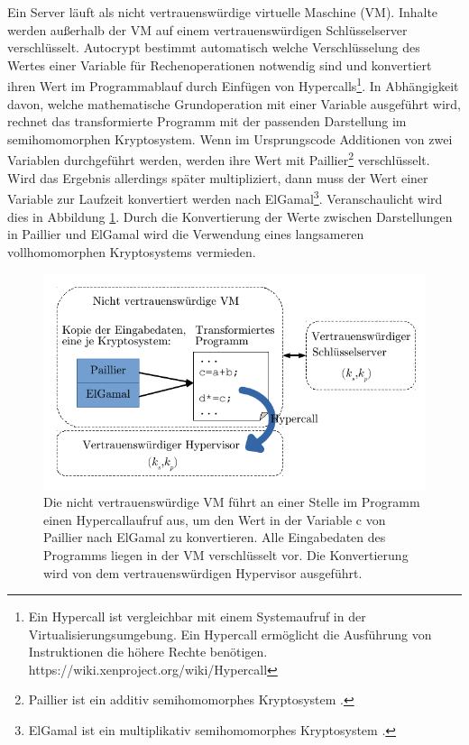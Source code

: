 Ein Server läuft als nicht vertrauenswürdige virtuelle Maschine (VM). Inhalte werden außerhalb der VM auf einem vertrauenswürdigen Schlüsselserver verschlüsselt. Autocrypt bestimmt automatisch welche Verschlüsselung des Wertes einer Variable für Rechenoperationen notwendig sind und konvertiert ihren Wert im Programmablauf durch Einfügen von Hypercalls\footnote{Ein Hypercall ist vergleichbar mit einem Systemaufruf in der Virtualisierungsumgebung. Ein Hypercall ermöglicht die Ausführung von Instruktionen die höhere Rechte benötigen. https://wiki.xenproject.org/wiki/Hypercall}. In Abhängigkeit davon, welche mathematische Grundoperation mit einer Variable ausgeführt wird, rechnet das transformierte Programm mit der passenden Darstellung im semihomomorphen Kryptosystem. Wenn im Ursprungscode Additionen von zwei Variablen durchgeführt werden, werden ihre Wert mit Paillier\footnote{Paillier ist ein additiv semihomomorphes Kryptosystem \cite{paillier1999public}.} verschlüsselt. Wird das Ergebnis allerdings später multipliziert, dann muss der Wert einer Variable zur Laufzeit konvertiert werden nach ElGamal\footnote{ElGamal ist ein multiplikativ semihomomorphes Kryptosystem \cite[p.32]{yi2014homomorphic}.}. Veranschaulicht wird dies in Abbildung \ref{fig:autocrypt}. Durch die Konvertierung der Werte zwischen Darstellungen in Paillier und ElGamal wird die Verwendung eines langsameren vollhomomorphen Kryptosystems vermieden.

\begin{figure}[h]
	\begin{center}
		\includegraphics{fig/Autocrypt}
		\caption{Die nicht vertrauenswürdige VM führt an einer Stelle im Programm einen Hypercallaufruf aus, um den Wert in der Variable c von Paillier nach ElGamal zu konvertieren. Alle Eingabedaten des Programms liegen in der VM verschlüsselt vor. Die Konvertierung wird von dem vertrauenswürdigen Hypervisor ausgeführt. }
		\label{fig:autocrypt}
	\end{center}
\end{figure}

